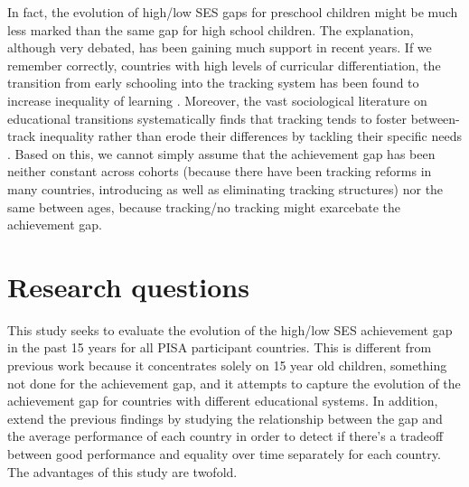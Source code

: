 \documentclass[11pt, a4paper]{article}\usepackage[]{graphicx}\usepackage[]{color}
\begin{document}
In fact, the evolution of high/low SES gaps for preschool children might be much less marked than the same gap for high school children. The explanation, although very debated, has been gaining much support in recent years. If we remember correctly, countries with high levels of curricular differentiation, the transition from early schooling into the tracking system has been found to increase inequality of learning \citep{hanushek_woesmann_tracking}. Moreover, the vast sociological literature on educational transitions systematically finds that tracking tends to foster between-track inequality rather than erode their differences by tackling their specific needs \citep{werfhorst_mijs}. Based on this, we cannot simply assume that the achievement gap has been neither constant across cohorts (because there have been tracking reforms in many countries, introducing as well as eliminating tracking structures) nor the same between ages, because tracking/no tracking might exarcebate the achievement gap.


\section{Research questions}

This study seeks to evaluate the evolution of the high/low SES achievement gap in the past 15 years for all PISA participant countries. This is different from previous work because it concentrates solely on 15 year old children, something not done for the achievement gap, and it attempts to capture the evolution of the achievement gap for countries with different educational systems. In addition, extend the previous findings by studying the relationship between the gap and the average performance of each country in order to detect if there's a tradeoff between good performance and equality over time separately for each country. The advantages of this study are twofold.
\end{document}
